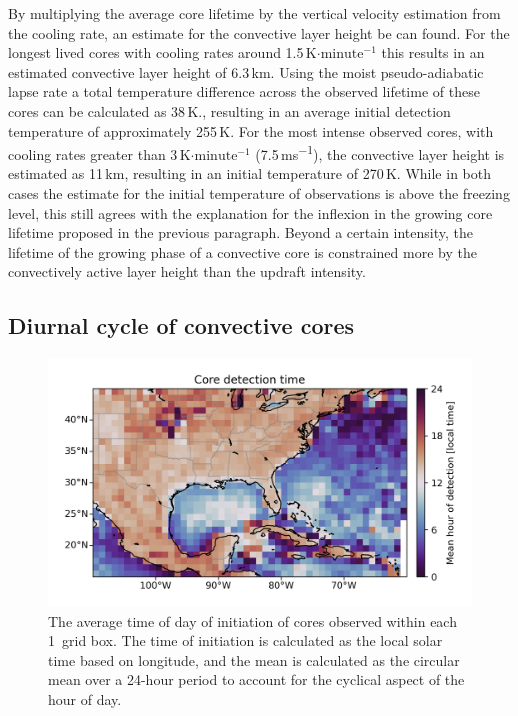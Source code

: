 By multiplying the average core lifetime by the vertical velocity estimation from the cooling rate, an estimate for the convective layer height be can found.
For the longest lived cores with cooling rates around 1.5\,K$\mathrm{\cdot minute^{-1}}$ this results in an estimated convective layer height of 6.3\,km.
Using the moist pseudo-adiabatic lapse rate a total temperature difference across the observed lifetime of these cores can be calculated as 38\,K., resulting in an average initial detection temperature of approximately 255\,K.
For the most intense observed cores, with cooling rates greater than 3\,K$\mathrm{\cdot minute^{-1}}$ (7.5\,\unit{ms^{-1}}), the convective layer height is estimated as 11\,km, resulting in an initial temperature of 270\,K.
While in both cases the estimate for the initial temperature of observations is above the freezing level, this still agrees with the explanation for the inflexion in the growing core lifetime proposed in the previous paragraph.
Beyond a certain intensity, the lifetime of the growing phase of a convective core is constrained more by the convectively active layer height than the updraft intensity.

\subsection{Diurnal cycle of convective cores}

\begin{figure}[tp]
    \centering
    \includegraphics[width=\textwidth]{figures/chapter2_11.png}
    \caption[
    A map of the average time of day of initiation of detected cores
    ]{
    The average time of day of initiation of cores observed within each 1\textdegree\ grid box. The time of initiation is calculated as the local solar time based on longitude, and the mean is calculated as the circular mean over a 24-hour period to account for the cyclical aspect of the hour of day.
    }
    \label{fig:core_detection_time_map}
\end{figure}

